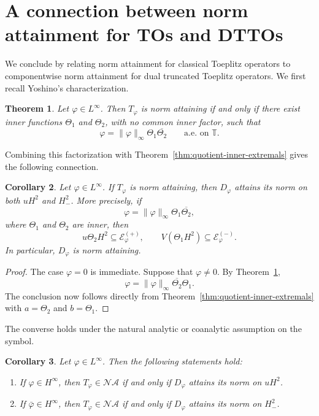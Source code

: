 \documentclass[12pt]{amsart}
\newtheorem{theorem}{Theorem}[section]
\newtheorem{corollary}[theorem]{Corollary}
\theoremstyle{definition}
\theoremstyle{remark}
\def \T{\mathbb{T}}
\newcommand{\cle}{\mathcal{E}}
\newcommand{\vp}{\varphi}
\numberwithin{equation}{section}
\begin{document}
\section{A connection between norm attainment for TOs and DTTOs}

We conclude by relating norm attainment for classical Toeplitz operators to componentwise norm attainment for dual truncated Toeplitz operators. We first recall Yoshino's characterization.

\begin{theorem}\cite{Yoshino2002}\label{thm:Toeplitz-NA}
Let $\vp\in L^\infty$. Then $T_\vp$ is norm attaining if and only if
there exist inner functions $\Theta_1$ and $\Theta_2$, with no common
inner factor, such that
\[
\vp=\|\vp\|_\infty\Theta_1\overline{\Theta_2} \qquad\text{a.e. on }\T.
\]
\end{theorem}

Combining this factorization with
Theorem~\ref{thm:quotient-inner-extremals} gives the following
connection.

\begin{corollary}\label{cor:Toeplitz-implies-DTTO}
Let $\vp\in L^\infty$. If $T_\vp$ is norm attaining, then $D_\vp$
attains its norm on both $uH^2$ and $H^2_{-}$. More precisely, if
\[
\vp=\|\vp\|_\infty\Theta_1\overline{\Theta_2},
\]
where $\Theta_1$ and $\Theta_2$ are inner, then
\[
u\Theta_2H^2\subseteq\cle_\vp^{(+)},
	\qquad
V(\Theta_1H^2)\subseteq\cle_\vp^{(-)}.
\]
In particular, $D_\vp$ is norm attaining.
\end{corollary}

\begin{proof}
The case $\vp=0$ is immediate. Suppose that $\vp\neq0$. By Theorem~\ref{thm:Toeplitz-NA},
\[
\vp=\|\vp\|_\infty\overline{\Theta_2}\Theta_1.
\]
The conclusion now follows directly from Theorem~\ref{thm:quotient-inner-extremals} with $a=\Theta_2$ and $b=\Theta_1$.
\end{proof}

The converse holds under the natural analytic or coanalytic
assumption on the symbol.

\begin{corollary}\label{cor:TO-DTTO-componentwise}
Let $\vp\in L^\infty$. Then the following statements hold:
\begin{enumerate}
\item If $\vp\in H^\infty$, then $T_\vp\in\mathcal{NA}$ if and only if $D_\vp$ attains its norm on $uH^2$.

		
\item If $\bar{\vp}\in H^\infty$, then $T_\vp\in\mathcal{NA}$ if and only if $D_\vp$ attains its norm on $H^2_{-}$.

\end{enumerate}
\end{corollary}
\end{document}
